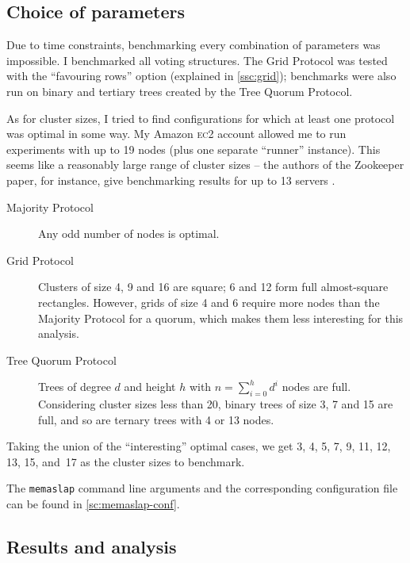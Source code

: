 \documentclass[12pt,chapterprefix=true,toc=bibliography,numbers=noendperiod,
               footnotes=multiple,twoside]{scrreprt}
\newcommand{\ECC}[0]{\textsc{ec}2 }
\begin{document}
\subsection{Choice of parameters}

Due to time constraints, benchmarking every combination of parameters was impossible. I benchmarked all voting structures. The Grid Protocol was tested with the \enquote{favouring rows} option (explained in \cref{ssc:grid}); benchmarks were also run on binary and tertiary trees created by the Tree Quorum Protocol.

As for cluster sizes, I tried to find configurations for which at least one protocol was optimal in some way. My Amazon \ECC account allowed me to run experiments with up to 19 nodes (plus one separate \enquote{runner} instance). This seems like a reasonably large range of cluster sizes -- the authors of the Zookeeper paper, for instance, give benchmarking results for up to 13 servers \autocite{zookeeper}.

\begin{description}
    \item[Majority Protocol] Any odd number of nodes is optimal.
    \item[Grid Protocol] Clusters of size 4, 9 and 16 are square; 6 and 12 form full almost-square rectangles. However, grids of size 4 and 6 require more nodes than the Majority Protocol for a quorum, which makes them less interesting for this analysis.
    \item[Tree Quorum Protocol] Trees of degree \(d\) and height \(h\) with \(n = \sum^h_{i=0} d^i\) nodes are full. Considering cluster sizes less than 20, binary trees of size 3, 7 and 15 are full, and so are ternary trees with 4 or 13 nodes.
\end{description}

Taking the union of the \enquote{interesting} optimal cases, we get 3, 4, 5, 7, 9, 11, 12, 13, 15, and~17 as the cluster sizes to benchmark.

The \texttt{memaslap} command line arguments and the corresponding configuration file can be found in \cref{sc:memaslap-conf}.

\subsection{Results and analysis}
\label{ssc:results}
\end{document}
